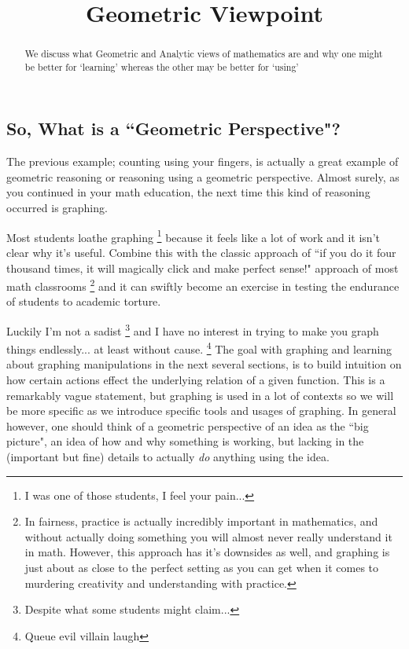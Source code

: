 \documentclass{ximeraXloud}
\title{Geometric Viewpoint}
\begin{document}
\begin{abstract}
    We discuss what Geometric and Analytic views of mathematics are and why one might be better for `learning' whereas the other may be better for `using'
\end{abstract}
\maketitle

\subsection*{So, What is a ``Geometric Perspective"?}
    
    The previous example; counting using your fingers, is actually a great example of geometric reasoning or reasoning using a geometric perspective. Almost surely, as you continued in your math education, the next time this kind of reasoning occurred is graphing. 
    
    Most students loathe graphing%
    \footnote{%
        I was one of those students, I feel your pain...%
        }
    because it feels like a lot of work and it isn't clear why it's useful. Combine this with the classic approach of ``if you do it four thousand times, it will magically click and make perfect sense!" approach of most math classrooms%
    \footnote{%
        In fairness, practice is actually incredibly important in mathematics, and without actually doing something you will almost never really understand it in math. However, this approach has it's downsides as well, and graphing is just about as close to the perfect setting as you can get when it comes to murdering creativity and understanding with practice.%
        }
    and it can swiftly become an exercise in testing the endurance of students to academic torture.
    
    Luckily I'm not a sadist%
    \footnote{%
        Despite what some students might claim...%
        }
    and I have no interest in trying to make you graph things endlessly... at least without cause.%
    \footnote{%
        Queue evil villain laugh%
        }
    The goal with graphing and learning about graphing manipulations in the next several sections, is to build intuition on how certain actions effect the underlying relation of a given function. This is a remarkably vague statement, but graphing is used in a lot of contexts so we will be more specific as we introduce specific tools and usages of graphing. In general however, one should think of a geometric perspective of an idea as the ``big picture", an idea of how and why something is working, but lacking in the (important but fine) details to actually \textit{do} anything using the idea.
    
\end{document}
